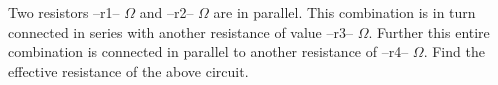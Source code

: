 \question Two resistors --r1-- $\Omega$ and --r2-- $\Omega$ are in parallel. This combination is in turn connected in series with another resistance of value --r3-- $\Omega$. Further this entire combination is connected in parallel to another resistance of --r4-- $\Omega$. Find the effective resistance of the above circuit.
\answerline